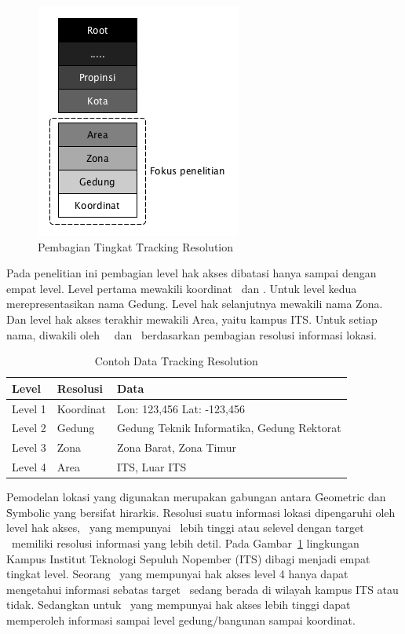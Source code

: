 \begin{figure}
    \centering
    \includegraphics[scale=0.80]
    {images/3-tracking-resolution.png}
    \caption{Pembagian Tingkat \f{Tracking Resolution}}
\label{fig:tracking-resolution}
\end{figure}

Pada penelitian ini pembagian level hak akses dibatasi hanya sampai dengan empat
level. Level pertama mewakili koordinat \latitude~dan \longitude. Untuk level
kedua merepresentasikan nama Gedung. Level hak selanjutnya mewakili nama Zona.
Dan level hak akses terakhir mewakili Area, yaitu kampus ITS. Untuk setiap nama,
diwakili oleh \centroid~\latitude~dan \longitude~berdasarkan pembagian resolusi
informasi lokasi.

\begin{table}
\centering
\caption{Contoh Data \f{Tracking Resolution}}
\label{tab:tracking-resolution}
    \begin{tabular}{l l l}
        \hline
        Level & Resolusi & Data \\
        \hline
        Level 1 & Koordinat & Lon: 123,456 Lat: -123,456 \\
        Level 2 & Gedung & Gedung Teknik Informatika, Gedung Rektorat \\
        Level 3 & Zona & Zona Barat, Zona Timur \\
        Level 4 & Area & ITS, Luar ITS \\
        \hline
    \end{tabular}
\end{table}

Pemodelan lokasi yang digunakan merupakan gabungan antara \f{Geometric} dan
\f{Symbolic} yang bersifat hirarkis. Resolusi suatu informasi lokasi dipengaruhi
oleh level hak akses, \tracker~yang mempunyai \Role~lebih tinggi atau selevel
dengan target \tracking~memiliki resolusi informasi yang lebih detil.  Pada
Gambar~\ref{fig:tracking-resolution} lingkungan Kampus Institut Teknologi
Sepuluh Nopember (ITS) dibagi menjadi empat tingkat level. Seorang \tracker~yang
mempunyai hak akses level 4 hanya dapat mengetahui informasi sebatas target
\tracking~sedang berada di wilayah kampus ITS atau tidak. Sedangkan untuk
\tracker~yang mempunyai hak akses lebih tinggi dapat memperoleh informasi sampai
level gedung/bangunan sampai koordinat.


